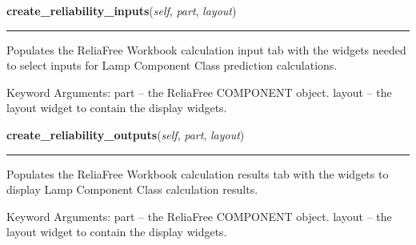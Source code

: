     \label{reliafree:miscellaneous:filter:Filter:create_reliability_inputs}

    \vspace{0.5ex}

\hspace{.8\funcindent}\begin{boxedminipage}{\funcwidth}

    \raggedright \textbf{create\_reliability\_inputs}(\textit{self}, \textit{part}, \textit{layout})

    \vspace{-1.5ex}

    \rule{\textwidth}{0.5\fboxrule}
\setlength{\parskip}{2ex}
    Populates the ReliaFree Workbook calculation input tab with the widgets
    needed to select inputs for Lamp Component Class prediction 
    calculations.

    Keyword Arguments: part   -- the ReliaFree COMPONENT object. layout -- 
    the layout widget to contain the display widgets.

\setlength{\parskip}{1ex}
    \end{boxedminipage}

    \label{reliafree:miscellaneous:filter:Filter:create_reliability_outputs}

    \vspace{0.5ex}

\hspace{.8\funcindent}\begin{boxedminipage}{\funcwidth}

    \raggedright \textbf{create\_reliability\_outputs}(\textit{self}, \textit{part}, \textit{layout})

    \vspace{-1.5ex}

    \rule{\textwidth}{0.5\fboxrule}
\setlength{\parskip}{2ex}
    Populates the ReliaFree Workbook calculation results tab with the 
    widgets to display Lamp Component Class calculation results.

    Keyword Arguments: part   -- the ReliaFree COMPONENT object. layout -- 
    the layout widget to contain the display widgets.

\setlength{\parskip}{1ex}
    \end{boxedminipage}

